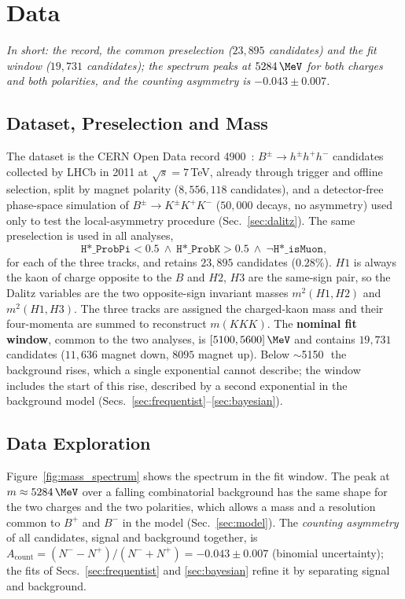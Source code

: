 \section{Data}
\label{sec:data}
\emph{In short: the record, the common preselection ($23{,}895$ candidates) and the fit window ($19{,}731$ candidates); the spectrum peaks at $5284\,\MeV$ for both charges and both polarities, and the counting asymmetry is $-0.043\pm0.007$.}
\subsection{Dataset, Preselection and Mass}
\label{sec:data_presel}
The dataset is the CERN Open Data record 4900~\cite{opendata_record}: $B^{\pm}\to h^{\pm}h^{+}h^{-}$ candidates collected by LHCb in 2011 at $\sqrt{s}=7$\,TeV, already through trigger and offline selection, split by magnet polarity ($8{,}556{,}118$ candidates), and a detector-free phase-space simulation of $B^{\pm}\to K^{\pm}K^{+}K^{-}$ ($50{,}000$ decays, no asymmetry) used only to test the local-asymmetry procedure (Sec.~\ref{sec:dalitz}). The same preselection is used in all analyses,
\[
\texttt{H*\_ProbPi} < 0.5 \ \wedge\ \texttt{H*\_ProbK} > 0.5 \ \wedge\ \lnot\texttt{H*\_isMuon},
\]
for each of the three tracks, and retains $23{,}895$ candidates ($0.28\%$). $H1$ is always the kaon of charge opposite to the $B$ and $H2$, $H3$ are the same-sign pair, so the Dalitz variables are the two opposite-sign invariant masses $m^2(H1,H2)$ and $m^2(H1,H3)$.
\label{sec:data_mass}
The three tracks are assigned the charged-kaon mass and their four-momenta are summed to reconstruct $m(KKK)$. The \textbf{nominal fit window}, common to the two analyses, is $[5100,5600]\,\MeV$ and contains $19{,}731$ candidates ($11{,}636$ magnet down, $8095$ magnet up). Below $\sim$5150\,\MeV\ the background rises, which a single exponential cannot describe; the window includes the start of this rise, described by a second exponential in the background model (Secs.~\ref{sec:frequentist}--\ref{sec:bayesian}).
\subsection{Data Exploration}
\label{sec:data_exploration}

Figure~\ref{fig:mass_spectrum} shows the spectrum in the fit window. The peak at $m\approx5284\,\MeV$ over a falling combinatorial background has the same shape for the two charges and the two polarities, which allows a mass and a resolution common to $B^+$ and $B^-$ in the model (Sec.~\ref{sec:model}). The \emph{counting asymmetry} of all candidates, signal and background together, is $A_{\mathrm{count}}=(N^--N^+)/(N^-+N^+)=-0.043\pm0.007$ (binomial uncertainty); the fits of Secs.~\ref{sec:frequentist} and \ref{sec:bayesian} refine it by separating signal and background.

